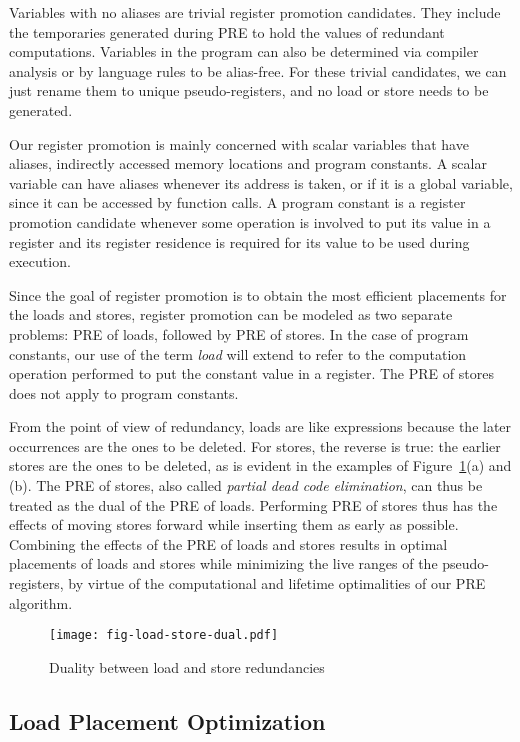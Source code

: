 Variables with no aliases are trivial register promotion candidates.  They
include the temporaries generated during PRE to hold the values of redundant 
computations.  Variables in the program can also be determined via compiler
analysis or by language rules to be alias-free.  For these trivial candidates,
we can just rename them to unique pseudo-registers, and no load or store needs
to be generated.  

Our register promotion is
mainly concerned with scalar variables that have aliases, indirectly accessed
memory locations and program constants.  A scalar variable can have aliases
whenever its address is taken, or if it is a global variable, since it can
be accessed by function calls.  A program constant is a register promotion
candidate whenever some operation is involved to put its value in a register and
its register residence is required for its value to be used during execution.

Since the goal of
register promotion is to obtain the most efficient placements for the loads and
stores, register promotion can be modeled as two separate problems: PRE of 
loads, followed by PRE of stores.  In the case of program constants, our use of
the term \emph{load} will extend to refer to the computation operation performed
to put the constant value in a register.  The PRE of stores does not apply
to program constants.

From the point of view of redundancy, loads are like expressions because the
later occurrences are the ones to be deleted.  For stores, the reverse is true:
the earlier stores are the ones to be deleted, as is evident in the examples
of Figure~\ref{fig:load-store-dual}(a) and (b).  The PRE of stores,
also called \emph{partial dead code elimination}, can thus be treated as the
dual of the PRE of loads.  Performing PRE of stores thus has the effects
of moving stores forward while inserting them as early as possible.  
Combining the effects of the PRE of loads and stores results in optimal
placements of loads and stores while minimizing the live ranges of the
pseudo-registers, by virtue of the computational and lifetime optimalities
of our PRE algorithm.

\begin{figure}
\centering
\texttt{[image: fig-load-store-dual.pdf]}
\caption{Duality between load and store redundancies}
\label{fig:load-store-dual}
\end{figure}

\subsection{Load Placement Optimization}


